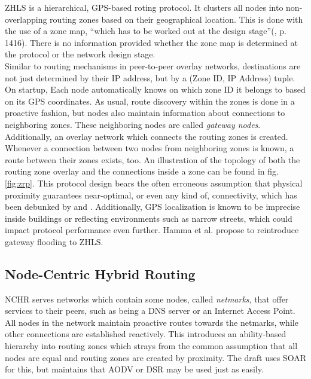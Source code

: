 \documentclass[a4paper,10pt]{scrartcl}
\begin{document}
ZHLS is a hierarchical, GPS-based roting protocol. It clusters all nodes into non-overlapping routing zones based on their geographical location. This is done with the use of a zone map, ``which has to be worked out at the design stage''(\cite{ZHLS}, p. 1416). There is no information provided whether the zone map is determined at the protocol or the network design stage.\\
Similar to routing mechanisms in peer-to-peer overlay networks, destinations are not just determined by their IP address, but by a (Zone ID, IP Address) tuple. On startup, Each node automatically knows on which zone ID it belongs to based on its GPS coordinates.
As usual, route discovery within the zones is done in a proactive fashion, but nodes also maintain information about connections to neighboring zones. These neighboring nodes are called \emph{gateway nodes}. Additionally, an overlay network which connects the routing zones is created. Whenever a connection between two nodes from neighboring zones is known, a route between their zones exists, too. An illustration of the topology of both the routing zone overlay and the connections inside a zone can be found in fig. \ref{fig:zrp}.
This protocol design bears the often erroneous assumption that physical proximity guarantees near-optimal, or even any kind of, connectivity, which has been debunked by \cite{mistaken-axioms} and \cite{lim_link_stability}. Additionally, GPS localization is known to be imprecise inside buildings or reflecting environments such as narrow streets, which could impact protocol performance even further. 
Hamma et al.\cite{ZHLS-GF} propose to reintroduce gateway flooding to ZHLS.

\subsection{Node-Centric Hybrid Routing}
\label{subsec:nchr}
NCHR\cite{Roy_nodecentric} serves networks which contain some nodes, called \emph{netmarks}, that offer services to their peers, such as being a DNS server or an Internet Access Point. All nodes in the network maintain proactive routes towards the netmarks, while other connections are established reactively. This introduces an ability-based hierarchy into routing zones which strays from the common assumption that all nodes are equal and routing zones are created by proximity. 
The draft uses SOAR\cite{SOAR} for this, but maintains that AODV\cite{RFC-3561} or DSR\cite{DSR} may be used just as easily.
\end{document}
